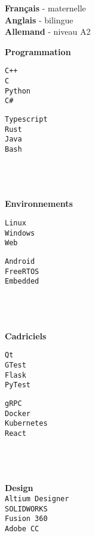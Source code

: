\documentclass[9pt]{developercv} %
\begin{document}
\begin{minipage}[t]{0.02\textwidth}
	\hfill
\end{minipage}
\begin{minipage}[t]{0.18\textwidth}
		\textbf{Français} - maternelle\\
		\textbf{Anglais} - bilingue\\
		\textbf{Allemand} - niveau A2

		\textbf{Programmation}\\
		\begin{minipage}[t]{0.5\textwidth}
			\texttt{C++}\\
			\texttt{C}\\
			\texttt{Python}\\
			\texttt{C\#}
		\end{minipage}
		\begin{minipage}[t]{0.45\textwidth}
			\texttt{Typescript}\\
			\texttt{Rust}\\
			\texttt{Java}\\
			\texttt{Bash}
		\end{minipage}
		\\\\\\
		\textbf{Environnements}\\
		\begin{minipage}[t]{0.5\textwidth}
			\texttt{Linux}\\
			\texttt{Windows}\\
			\texttt{Web}
		\end{minipage}
		\begin{minipage}[t]{0.45\textwidth}
			\texttt{Android}\\
			\texttt{FreeRTOS}\\
			\texttt{Embedded}
		\end{minipage}
		\\\\\\
		\textbf{Cadriciels}\\
		\begin{minipage}[t]{0.5\textwidth}
			\texttt{Qt}\\
			\texttt{GTest}\\
			\texttt{Flask}\\
			\texttt{PyTest}
		\end{minipage}
		\begin{minipage}[t]{0.45\textwidth}
			\texttt{gRPC}\\
			\texttt{Docker}\\
			\texttt{Kubernetes}\\
			\texttt{React}
		\end{minipage}
		\\\\\\
		\textbf{Design}\\
		\texttt{Altium Designer}\\
		\texttt{SOLIDWORKS}\\
		\texttt{Fusion 360}\\
		\texttt{Adobe CC}


\end{minipage}
\end{document}
